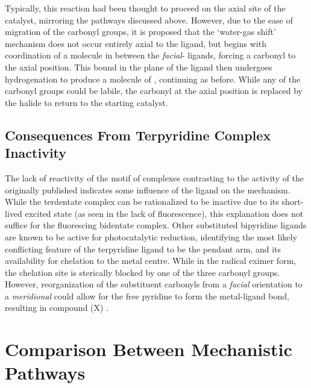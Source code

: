 Typically, this reaction had been thought to proceed on the axial site of the catalyst, mirroring the pathways discussed above. However, due to the ease of migration of the carbonyl groups, it is proposed that the `water-gas shift' mechanism does not occur entirely axial to the ligand, but begins with coordination of a  molecule in between the \textit{facial}- ligands, forcing a carbonyl to the axial position. This  bound in the plane of the ligand then undergoes hydrogenation to produce a molecule of , continuing as before. While any of the carbonyl groups could be labile, the carbonyl at the axial position is replaced by the halide to return to the starting catalyst\autocite{shaver1992}. 

\subsection{Consequences From \texorpdfstring{}{Bidentate} Terpyridine Complex Inactivity}

The lack of reactivity of the  motif of complexes contrasting to the activity of the originally published  indicates some influence of the ligand on the mechanism. While the terdentate complex can be rationalized to be inactive due to its short-lived excited state (as seen in the lack of fluorescence), this explanation does not suffice for the fluorescing bidentate complex. Other substituted bipyridine ligands are known to be active for photocatalytic reduction, identifying the most likely conflicting feature of the terpyridine ligand to be the pendant arm, and its availability for chelation to the metal centre. While in the radical eximer form, the chelation site is sterically blocked by one of the three carbonyl groups. However, reorganization of the substituent carbonyls from a \textit{facial} orientation to a \textit{meridional} could allow for the free pyridine to form the metal-ligand bond, resulting in compound (X) .  

\section{Comparison Between Mechanistic Pathways} \label{sec.compare}

